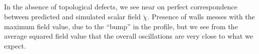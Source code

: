     


    

\subsection{}
    In the absence of topological defects, we see near on perfect correspondence between predicted and simulated scalar field $\breve{\chi}$. Presence of walls messes with the maximum field value, due to the ``bump'' in the profile, but we see from the average squared field value that the overall oscillations are very close to what we expect. 